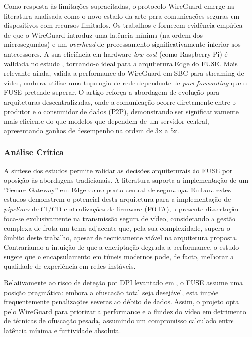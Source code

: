 Como resposta às limitações supracitadas, o protocolo WireGuard emerge na literatura analisada como o novo estado da arte para comunicações seguras em dispositivos com recursos limitados. Os trabalhos \cite{hohmann_bridge_2021} e \cite{dang_ewdc_2025} fornecem evidência empírica de que o WireGuard introduz uma latência mínima (na ordem dos microsegundos) e um \textit{overhead} de processamento significativamente inferior aos antecessores. A sua eficiência em hardware \textit{low-cost} (como Raspberry Pi) é validada no estudo \cite{bezenk_remote_2024}, tornando-o ideal para a arquitetura Edge do \gls{FUSE}.
Mais relevante ainda, \cite{resende_sistema_2025} valida a performance do WireGuard em \gls{SBC} para streaming de vídeo, embora utilize uma topologia de rede dependente de \textit{port forwarding} que o \gls{FUSE} pretende superar. O artigo \cite{tong_daiottalk_2025} reforça a abordagem de evolução para arquiteturas descentralizadas, onde a comunicação ocorre diretamente entre o produtor e o consumidor de dados (P2P), demonstrando ser significativamente mais eficiente do que modelos que dependem de um servidor central, apresentando ganhos de desempenho na ordem de 3x a 5x.

\subsubsection{Análise Crítica}

A síntese dos estudos permite validar as decisões arquiteturais do \gls{FUSE} por oposição às abordagens tradicionais. A literatura suporta a implementação de um ''Secure Gateway'' em Edge \cite{garcia_containerized_2023, k_efficient_2024} como ponto central de segurança. Embora estes estudos demonstrem o potencial desta arquitetura para a implementação de \textit{pipelines} de \gls{CI/CD} e atualizações de firmware (\gls{FOTA}), a presente dissertação foca-se exclusivamente na transmissão segura de vídeo, considerando a gestão complexa de frota um tema adjacente que, pela sua complexidade, supera o âmbito deste trabalho, apesar de tecnicamente viável na arquitetura proposta. Contrariando a intuição de que a encriptação degrada a performance, o estudo \cite{avanzato_enhancing_2023} sugere que o encapsulamento em túneis modernos pode, de facto, melhorar a qualidade de experiência em redes instáveis.

Relativamente ao risco de deteção por \gls{DPI} levantado em \cite{xue_openvpn_2024}, o \gls{FUSE} assume uma posição pragmática: embora a ofuscação total seja desejável, esta impõe frequentemente penalizações severas ao débito de dados. Assim, o projeto opta pelo WireGuard para priorizar a performance e a fluidez do vídeo em detrimento de técnicas de ofuscação pesada, assumindo um compromisso calculado entre latência mínima e furtividade absoluta.

